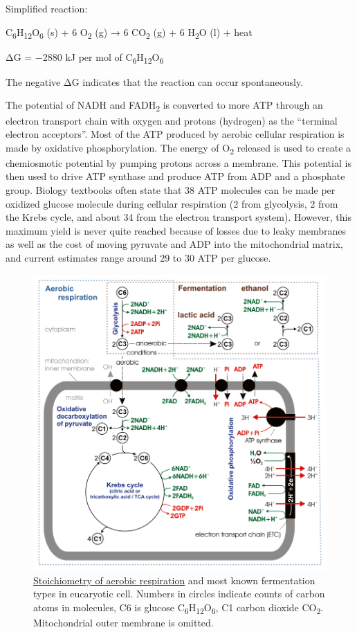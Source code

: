 Simplified reaction:

C\textsubscript{6}H\textsubscript{12}O\textsubscript{6} (s) + 6 O\textsubscript{2} (g) → 6 CO\textsubscript{2} (g) + 6 H\textsubscript{2}O (l) + heat

ΔG = −2880 kJ per mol of C\textsubscript{6}H\textsubscript{12}O\textsubscript{6}

The negative ΔG indicates that the reaction can occur spontaneously.

The potential of NADH and FADH\textsubscript{2} is converted to more ATP through an electron transport chain with oxygen and protons (hydrogen) as the ``terminal electron acceptors''. Most of the ATP produced by aerobic cellular respiration is made by oxidative phosphorylation. The energy of O\textsubscript{2} released is used to create a chemiosmotic potential by pumping protons across a membrane. This potential is then used to drive ATP synthase and produce ATP from ADP and a phosphate group. Biology textbooks often state that 38 ATP molecules can be made per oxidized glucose molecule during cellular respiration (2 from glycolysis, 2 from the Krebs cycle, and about 34 from the electron transport system). However, this maximum yield is never quite reached because of losses due to leaky membranes as well as the cost of moving pyruvate and ADP into the mitochondrial matrix, and current estimates range around 29 to 30 ATP per glucose.



\begin{figure}

{\centering \includegraphics[width=0.7\linewidth]{./figures/photosynthesis/Cellular_respiration} 

}

\caption{\href{https://commons.wikimedia.org/wiki/File:Cellular_respiration.gif}{Stoichiometry of aerobic respiration} and most known fermentation types in eucaryotic cell. Numbers in circles indicate counts of carbon atoms in molecules, C6 is glucose C\textsubscript{6}H\textsubscript{12}O\textsubscript{6}, C1 carbon dioxide CO\textsubscript{2}. Mitochondrial outer membrane is omitted.}\label{fig:cellresstoich}
\end{figure}

